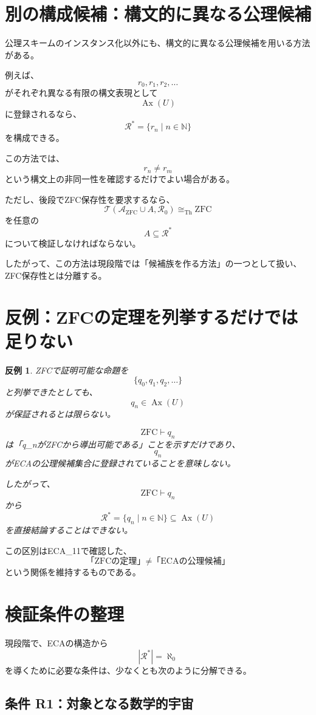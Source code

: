 \documentclass[a4paper,11pt]{ltjsarticle}
\newtheorem{counterexample}[definition]{反例}
\newcommand{\ZFC}{\mathrm{ZFC}}
\begin{document}
\section{別の構成候補：構文的に異なる公理候補}

公理スキームのインスタンス化以外にも、構文的に異なる公理候補を用いる方法がある。

例えば、
\[
r_0,r_1,r_2,\ldots
\]
がそれぞれ異なる有限の構文表現として
\[
\operatorname{Ax}(U)
\]
に登録されるなら、
\[
\mathcal R^*
=
\{r_n\mid n\in\mathbb N\}
\]
を構成できる。

この方法では、
\[
r_n\neq r_m
\]
という構文上の非同一性を確認するだけでよい場合がある。

ただし、後段でZFC保存性を要求するなら、
\[
\mathcal T
\left(
\mathcal A_{\mathrm{ZFC}}\cup A,\mathcal R_0
\right)
\cong_{\mathrm{Th}}\ZFC
\]
を任意の
\[
A\subseteq\mathcal R^*
\]
について検証しなければならない。

したがって、この方法は現段階では「候補族を作る方法」の一つとして扱い、ZFC保存性とは分離する。

\section{反例：ZFCの定理を列挙するだけでは足りない}

\begin{counterexample}
ZFCで証明可能な命題を
\[
\{q_0,q_1,q_2,\ldots\}
\]
と列挙できたとしても、
\[
q_n\in\operatorname{Ax}(U)
\]
が保証されるとは限らない。

\[
\ZFC\vdash q_n
\]
は「q_nがZFCから導出可能である」ことを示すだけであり、
\[
q_n
\]
がECAの公理候補集合に登録されていることを意味しない。

したがって、
\[
\ZFC\vdash q_n
\]
から
\[
\mathcal R^*
=
\{q_n\mid n\in\mathbb N\}
\subseteq\operatorname{Ax}(U)
\]
を直接結論することはできない。
\end{counterexample}

この区別はECA_11で確認した、
\[
\text{「ZFCの定理」}
\neq
\text{「ECAの公理候補」}
\]
という関係を維持するものである。

\section{検証条件の整理}

現段階で、ECAの構造から
\[
|\mathcal R^*|=\aleph_0
\]
を導くために必要な条件は、少なくとも次のように分解できる。

\subsection*{条件 R1：対象となる数学的宇宙}
\end{document}
